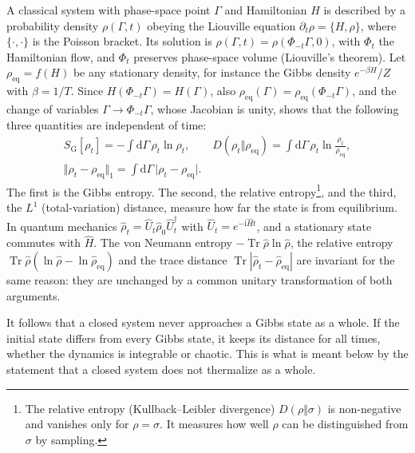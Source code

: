 \documentclass[10pt,a4paper]{article}
\newcommand{\dd}{\mathrm{d}}
\newcommand{\ii}{\mathrm{i}}
\newcommand{\Tr}{\operatorname{Tr}}
\begin{document}
A classical system with phase-space point $ \Gamma $ and Hamiltonian $ H $ is described by a probability density $ \rho(\Gamma,t) $ obeying the Liouville equation $ \partial_t \rho = \{ H , \rho \} $, where $ \{\cdot,\cdot\} $ is the Poisson bracket.
Its solution is $ \rho(\Gamma,t) = \rho(\Phi_{-t}\Gamma, 0) $, with $ \Phi_t $ the Hamiltonian flow, and $ \Phi_t $ preserves phase-space volume (Liouville's theorem).
Let $ \rho_{\mathrm{eq}} = f(H) $ be any stationary density, for instance the Gibbs density $ e^{-\beta H}/Z $ with $ \beta = 1/T $.
Since $ H(\Phi_{-t}\Gamma) = H(\Gamma) $, also $ \rho_{\mathrm{eq}}(\Gamma) = \rho_{\mathrm{eq}}(\Phi_{-t}\Gamma) $, and the change of variables $ \Gamma \to \Phi_{-t}\Gamma $, whose Jacobian is unity, shows that the following three quantities are independent of time:
\begin{equation}
  \begin{gathered}
  S_{\mathrm{G}}[\rho_t] = -\int \dd\Gamma \, \rho_t \ln \rho_t ,
  \qquad
  D(\rho_t \Vert \rho_{\mathrm{eq}}) = \int \dd\Gamma \, \rho_t \ln \frac{\rho_t}{\rho_{\mathrm{eq}}} ,
  \\
  \Vert \rho_t - \rho_{\mathrm{eq}} \Vert_1 = \int \dd\Gamma \, \big| \rho_t - \rho_{\mathrm{eq}} \big| .
  \end{gathered}
  \label{eq:invariants}
\end{equation}
The first is the Gibbs entropy.
The second, the relative entropy\footnote{The relative entropy (Kullback--Leibler divergence) $ D(\rho\Vert\sigma) $ is non-negative and vanishes only for $ \rho = \sigma $. It measures how well $ \rho $ can be distinguished from $ \sigma $ by sampling.}, and the third, the $ L^1 $ (total-variation) distance, measure how far the state is from equilibrium.
In quantum mechanics $ \hat\rho_t = \hat U_t \hat\rho_0 \hat U_t^\dagger $ with $ \hat U_t = e^{-\ii \hat H t} $, and a stationary state commutes with $ \hat H $.
The von Neumann entropy $ -\Tr \hat\rho \ln \hat\rho $, the relative entropy $ \Tr \hat\rho (\ln\hat\rho - \ln\hat\rho_{\mathrm{eq}}) $ and the trace distance $ \Tr | \hat\rho_t - \hat\rho_{\mathrm{eq}} | $ are invariant for the same reason: they are unchanged by a common unitary transformation of both arguments.

It follows that a closed system never approaches a Gibbs state as a whole.
If the initial state differs from every Gibbs state, it keeps its distance for all times, whether the dynamics is integrable or chaotic.
This is what is meant below by the statement that a closed system does not thermalize as a whole.
\end{document}
